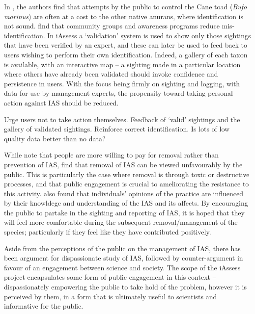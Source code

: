 \documentclass[10pt,psfig,letterpaper,twocolumn]{article}
\begin{document}
In \citet{Somaweera:2010vi}, the authors find that attempts by the public to control the Cane toad (\emph{Bufo marinus}) are often at a cost to the other native anurans, where identification is not sound. \citet{Somaweera:2010vi} find that community groups and awareness programs reduce mis-identification. In iAssess a `validation' system is used to show only those sightings that have been verified by an expert, and these can later be used to feed back to users wishing to perform their own identification. Indeed, a gallery of each taxon is available, with an interactive map -- a sighting made in a particular location where others have already been validated should invoke confidence and persistence in users. With the focus being firmly on sighting and logging, with data for use by management experts, the propensity toward taking personal action against IAS should be reduced. 

 Urge users not to take action themselves. Feedback of `valid' sightings and the gallery of validated sightings. Reinforce correct identification.
Is lots of low quality data better than no data?

While \citet{GarciaLlorente:vx} note that people are more willing to pay for removal rather than prevention of IAS, \citet{Sharp:2011eh} find that removal of IAS can be viewed unfavourably by the public. This is particularly the case where removal is through toxic or destructive processes, and that public engagement is crucial to ameliorating the resistance to this activity. \citet{GarciaLlorente:vx} also found that individuals' opinions of the practice are influenced by their knowldege and understanding of the IAS and its affects. By encouraging the public to partake in the sighting and reporting of IAS, it is hoped that they will feel more comfortable during the subsequent removal/management of the species; particularly if they feel like they have contributed positively. 

Aside from the perceptions of the public on the management of IAS, there has been argument \cite{Brown:2004uj} for dispassionate study of IAS, followed by counter-argument \cite{Larson:2007vs} in favour of an engagement between science and society. The scope of the iAssess project encapsulates some form of public engagement in this context -- dispassionately empowering the public to take hold of the problem, however it is perceived by them, in a form that is ultimately useful to scientists and informative for the public.

\section*{}
\end{document}
